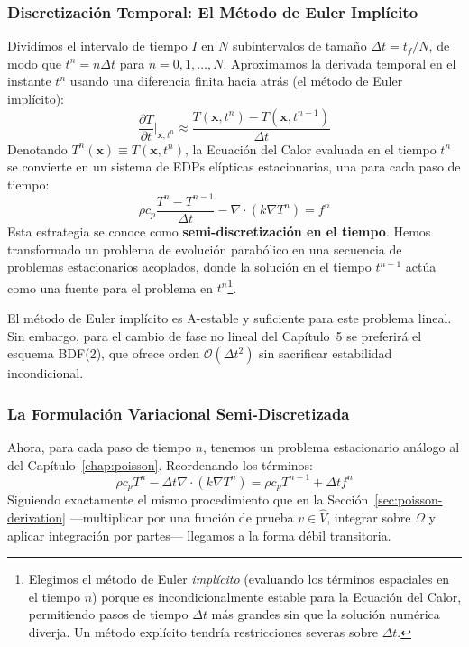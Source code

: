 \subsubsection{Discretización Temporal: El Método de Euler Implícito}
Dividimos el intervalo de tiempo \(I\) en \(N\) subintervalos de tamaño \(\Delta t = t_f / N\), de modo que \(t^n = n \Delta t\) para \(n=0, 1, \dots, N\). Aproximamos la derivada temporal en el instante \(t^n\) usando una diferencia finita hacia atrás (el método de Euler implícito):
\begin{equation}
    \frac{\partial T}{\partial t} \bigg|_{\bm{x}, t^n} \approx \frac{T(\bm{x}, t^n) - T(\bm{x}, t^{n-1})}{\Delta t}
    \label{eq:euler-backward}
\end{equation}
Denotando \(T^n(\bm{x}) \equiv T(\bm{x}, t^n)\), la Ecuación del Calor evaluada en el tiempo \(t^n\) se convierte en un sistema de EDPs elípticas estacionarias, una para cada paso de tiempo:
\[
\rho c_p \frac{T^n - T^{n-1}}{\Delta t} - \nabla \cdot (k \nabla T^n) = f^n
\]
Esta estrategia se conoce como \textbf{semi-discretización en el tiempo}. Hemos transformado un problema de evolución parabólico en una secuencia de problemas estacionarios acoplados, donde la solución en el tiempo \(t^{n-1}\) actúa como una fuente para el problema en \(t^n\)\footnote{Elegimos el método de Euler \textit{implícito} (evaluando los términos espaciales en el tiempo \(n\)) porque es incondicionalmente estable para la Ecuación del Calor, permitiendo pasos de tiempo \(\Delta t\) más grandes sin que la solución numérica diverja. Un método explícito tendría restricciones severas sobre \(\Delta t\).}.

\begin{notatecnica}
El método de Euler implícito es A-estable y suficiente para este problema lineal. Sin embargo, para el cambio de fase no lineal del Capítulo~5 se preferirá el esquema BDF(2), que ofrece orden $\mathcal{O}(\Delta t^2)$ sin sacrificar estabilidad incondicional.
\end{notatecnica}

\subsubsection{La Formulación Variacional Semi-Discretizada}
Ahora, para cada paso de tiempo \(n\), tenemos un problema estacionario análogo al del Capítulo~\ref{chap:poisson}. Reordenando los términos:
\[
\rho c_p T^n - \Delta t \nabla \cdot (k \nabla T^n) = \rho c_p T^{n-1} + \Delta t f^n
\]
Siguiendo exactamente el mismo procedimiento que en la Sección~\ref{sec:poisson-derivation} ---multiplicar por una función de prueba \(v \in \hat{V}\), integrar sobre \(\Omega\) y aplicar integración por partes--- llegamos a la forma débil transitoria.

